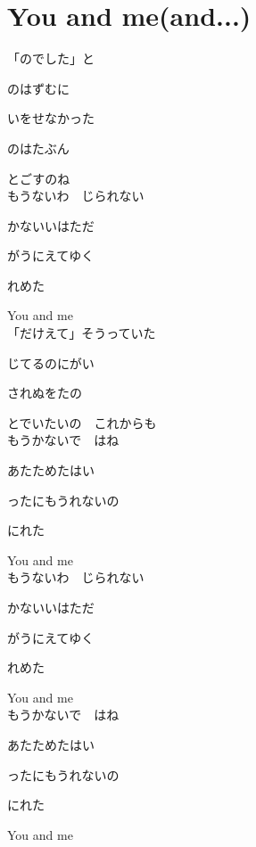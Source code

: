 \section{ You and me(and...)}
\large{

「のでした」と

のはずむに

いをせなかった

のはたぶん

とごすのね
\\

もうないわ　じられない

かないいはただ

がうにえてゆく

れめた

You and me
\\

「だけえて」そうっていた

じてるのにがい

されぬをたの

とでいたいの　これからも
\\

もうかないで　はね

あたためたはい

ったにもうれないの

にれた

You and me
\\

もうないわ　じられない

かないいはただ

がうにえてゆく

れめた

You and me
\\

もうかないで　はね

あたためたはい

ったにもうれないの

にれた

You and me

}
